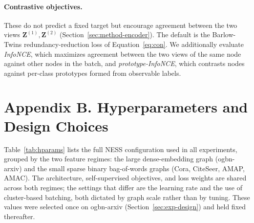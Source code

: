 \paragraph{Contrastive objectives.} These do not predict a fixed target but encourage agreement between the two views $\mathbf{Z}^{(1)},\mathbf{Z}^{(2)}$ (Section~\ref{sec:method-encoder}). The default is the Barlow-Twins redundancy-reduction loss of Equation~\eqref{eq:con}. We additionally evaluate \emph{InfoNCE}, which maximizes agreement between the two views of the same node against other nodes in the batch, and \emph{prototype-InfoNCE}, which contrasts nodes against per-class prototypes formed from observable labels.






\section*{Appendix B. Hyperparameters and Design Choices}
\label{sec:setup-hparams}

Table~\ref{tab:hparams} lists the full NESS configuration used in all experiments, grouped by the two feature regimes: the large dense-embedding graph (ogbn-arxiv) and the small sparse binary bag-of-words graphs (Cora, CiteSeer, AMAP, AMAC). The architecture, self-supervised objectives, and loss weights are shared across both regimes; the settings that differ are the learning rate and the use of cluster-based batching, both dictated by graph scale rather than by tuning. These values were selected once on ogbn-arxiv (Section~\ref{sec:exp-design}) and held fixed thereafter.

